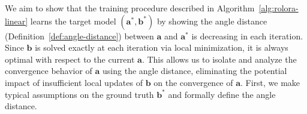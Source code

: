 \documentclass{article}
\DeclareMathOperator*{\argmin}{arg\,min}
\theoremstyle{plain}
\theoremstyle{definition}
\theoremstyle{remark}
\begin{document}
We aim to show that the training procedure described in Algorithm~\ref{alg:rolora-linear} learns the target model $(\mathbf{a}^*,\mathbf{b}^*)$ by showing the angle distance (Definition~\ref{def:angle-distance}) between $\mathbf{a}$ and $\mathbf{a}^*$ is decreasing in each iteration. Since $\mathbf{b}$ is solved exactly at each iteration via local minimization, it is always optimal with respect to the current $\mathbf{a}$. This allows us to isolate and analyze the convergence behavior of $\mathbf{a}$ using the angle distance, eliminating the potential impact of insufficient local updates of $\mathbf{b}$ on the convergence of $\mathbf{a}$.
 First, we make typical assumptions on the ground truth $\mathbf{b}^*$ and formally define the angle distance.

 
\end{document}
